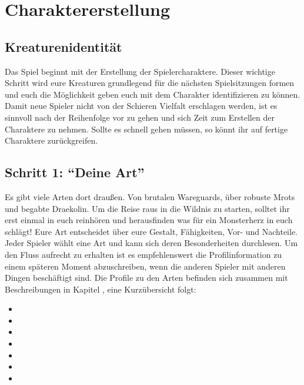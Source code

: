 \chapter{Charaktererstellung}


    \section{Kreaturenidentität}
        Das Spiel beginnt mit der Erstellung der Spielercharaktere. Dieser wichtige Schritt wird eure Kreaturen grundlegend für die nächsten Spielsitzungen formen und euch die Möglichkeit geben euch mit dem Charakter identifizieren zu können. Damit neue Spieler nicht von der Schieren Vielfalt erschlagen werden, ist es sinnvoll nach der Reihenfolge vor zu gehen und sich Zeit zum Erstellen der Charaktere zu nehmen. Sollte es schnell gehen müssen, so könnt ihr auf fertige Charaktere zurückgreifen.
        
    

    \section{Schritt 1: “Deine Art”}
        Es gibt viele Arten dort draußen. Von brutalen Wareguards, über robuste Mrots und begabte Draekolin. Um die Reise raus in die Wildnis zu starten, solltet ihr erst einmal in euch reinhören und herausfinden was für ein Monsterherz in euch schlägt! Eure Art entscheidet über eure Gestalt, Fähigkeiten, Vor- und Nachteile. Jeder Spieler wählt eine Art und kann sich deren Besonderheiten durchlesen. Um den Fluss aufrecht zu erhalten ist es empfehlenswert die Profilinformation zu einem späteren Moment abzuschreiben, wenn die anderen Spieler mit anderen Dingen beschäftigt sind. Die Profile zu den Arten befinden sich zusammen mit Beschreibungen in Kapitel , eine Kurzübersicht folgt:
        
        \begin{itemize}
	    \item {}
	    \item {}
	    \item {}
	    \item {}
	    \item {}
	    \item {}
	    \item {}
    \end{itemize}
        
